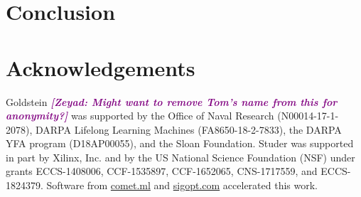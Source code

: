\documentclass{article}
\newcommand{\zeyad}[1]{{  \textcolor{purple}{\bf \em [Zeyad: #1]}}}
\begin{document}
    \section{Conclusion}

    \section{Acknowledgements}
    Goldstein \zeyad{Might want to remove Tom's name from this for anonymity?} was supported by the Office of Naval Research (N00014-17-1-2078), DARPA Lifelong Learning Machines (FA8650-18-2-7833), the DARPA YFA program (D18AP00055), and the Sloan Foundation. Studer was supported in part by Xilinx, Inc. and by the US National Science Foundation (NSF) under grants ECCS-1408006, CCF-1535897, CCF-1652065, CNS-1717559, and ECCS-1824379. Software from \url{comet.ml} and \url{sigopt.com} accelerated this work.

    \newpage
    


\end{document}
